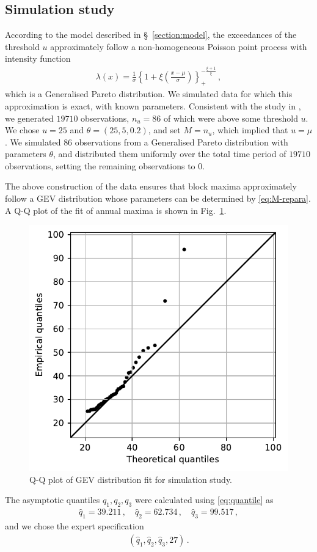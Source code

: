 \documentclass{article}
\begin{document}
\subsection{Simulation study}
%

%
According to the model described in \S~\ref{section:model},
the exceedances of the threshold $u$ approximately
follow a non-homogeneous Poisson point process with intensity function
%
\begin{align*}
	\lambda(x) = \frac{1}{\sigma}
		\left\{1 + \xi \left(\frac{x - \mu}{\sigma}\right)\right\}_+
		^ {-\frac{\xi + 1}{\xi}} \,,
\end{align*}
%
which is a Generalised Pareto distribution.
We simulated data for which this approximation is exact,
with known parameters.
Consistent with the study in \cite{coles1996},
we generated $19710$ observations, $n_u = 86$ of which were above
some threshold $u$. We chose $u = 25$ and $\theta = (25, 5, 0.2)$,
and set $M = n_u$, which implied that $u = \mu$.
We simulated $86$ observations from a
Generalised Pareto distribution with parameters $\theta$,
and distributed them uniformly
over the total time period of $19710$ observations,
setting the remaining observations to $0$.
%

%
The above construction of the data ensures that block maxima approximately
follow a GEV distribution whose parameters can be determined
by \eqref{eq:M-repara}.
A Q-Q plot of the fit of annual maxima is shown in Fig.~\ref{fig:ppp-qq}.
%
\begin{figure}
	\centering
	\includegraphics[width=0.55\linewidth]{plots/ppp-qq.pdf}
	\caption{Q-Q plot of GEV distribution fit for simulation study.}
	\label{fig:ppp-qq}
\end{figure}
%
The asymptotic quantiles $q_1, q_2, q_3$ were calculated
using \eqref{eq:quantile} as
%
\begin{align*}
	\hat{q}_1 = 39.211 \,,
	\quad \hat{q}_2 = 62.734 \,,
	\quad \hat{q}_3 = 99.517 \,,
\end{align*}
%
and we chose the expert specification
%
\begin{align*}
	\left(\hat{q}_1, \hat{q}_2, \hat{q}_3, 27 \right) \,.
\end{align*}
%
\end{document}
